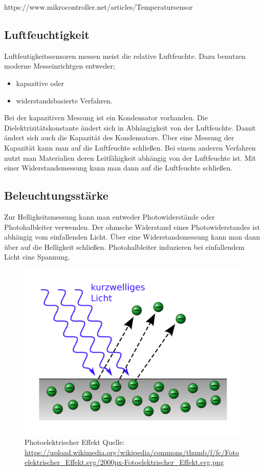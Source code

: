 https://www.mikrocontroller.net/articles/Temperatursensor
\subsection{Luftfeuchtigkeit}
\label{sec:Luftfeute}
Luftfeutigkeitssensoren messen meist die relative Luftfeuchte. Dazu benutzen moderne Messeinrichtgen entweder;
\begin{itemize}
\item kapazitive oder 
\item widerstandsbasierte Verfahren.
\end{itemize}
Bei der kapazitiven Messung ist ein Kondensator vorhanden.  Die Dielektrizitätskonstante ändert sich in Abhängigkeit von der Luftfeuchte. Damit ändert sich auch die Kapazität des Kondensators. Über eine Messung der Kapazität kann man auf die Luftfeuchte schließen.
Bei einem anderen Verfahren nutzt man Materialien deren Leitfähigkeit abhängig von der Luftfeuchte ist. Mit einer Widerstandsmessung kann man dann auf die Luftfeuchte schließen.



\subsection{Beleuchtungsstärke}
Zur Helligkeitsmessung kann man entweder Photowiderstände oder Photohalbleiter verwenden. 
Der ohmsche Widerstand eines Photowiderstandes ist abhängig vom einfallenden Licht. Über eine Widerstandsmessung kann man dann über auf die Helligkeit schließen. 
Photohalbleiter induzieren bei einfallendem Licht eine Spannung.

\begin{figure}
\includegraphics[scale=0.1]{bilder/Fotoelektrischer_Effekt} 
\caption{Photoelektrischer Effekt Quelle: \url{https://upload.wikimedia.org/wikipedia/commons/thumb/f/fc/Fotoelektrischer_Effekt.svg/2000px-Fotoelektrischer_Effekt.svg.png}}
\label{Bewegungsmelder}
\end{figure}

